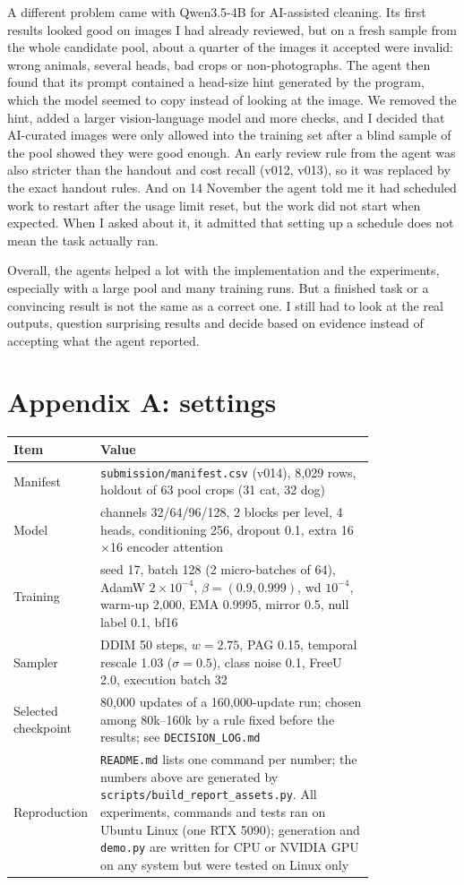 \documentclass[10pt]{article}
\begin{document}
A different problem came with Qwen3.5-4B for AI-assisted cleaning. Its first results looked good on images I had already reviewed, but on a fresh sample from the whole candidate pool, about a quarter of the images it accepted were invalid: wrong animals, several heads, bad crops or non-photographs. The agent then found that its prompt contained a head-size hint generated by the program, which the model seemed to copy instead of looking at the image. We removed the hint, added a larger vision-language model and more checks, and I decided that AI-curated images were only allowed into the training set after a blind sample of the pool showed they were good enough. An early review rule from the agent was also stricter than the handout and cost recall (v012, v013), so it was replaced by the exact handout rules. And on 14 November the agent told me it had scheduled work to restart after the usage limit reset, but the work did not start when expected. When I asked about it, it admitted that setting up a schedule does not mean the task actually ran.

Overall, the agents helped a lot with the implementation and the experiments, especially with a large pool and many training runs. But a finished task or a convincing result is not the same as a correct one. I still had to look at the real outputs, question surprising results and decide based on evidence instead of accepting what the agent reported.

\label{mainend}
{\footnotesize\setlength{\itemsep}{0pt}\setlength{\parskip}{0pt}

}
\appendix
\section*{Appendix A: settings}
\small
\begin{tabular}{@{}lp{0.80\linewidth}@{}}
\toprule
Item & Value \\
\midrule
Manifest & \texttt{submission/manifest.csv} (v014), 8{,}029 rows, holdout of 63 pool crops (31 cat, 32 dog) \\
Model & channels 32/64/96/128, 2 blocks per level, 4 heads, conditioning 256, dropout 0.1, extra 16$\times$16 encoder attention \\
Training & seed 17, batch 128 (2 micro-batches of 64), AdamW $2{\times}10^{-4}$, $\beta=(0.9,0.999)$, wd $10^{-4}$, warm-up 2{,}000, EMA 0.9995, mirror 0.5, null label 0.1, bf16 \\
Sampler & DDIM 50 steps, $w=2.75$, PAG 0.15, temporal rescale 1.03 ($\sigma=0.5$), class noise 0.1, FreeU 2.0, execution batch 32 \\
Selected checkpoint & 80{,}000 updates of a 160{,}000-update run; chosen among 80k--160k by a rule fixed before the results; see \texttt{DECISION\_LOG.md} \\
Reproduction & \texttt{README.md} lists one command per number; the numbers above are generated by \texttt{scripts/build\_report\_assets.py}. All experiments, commands and tests ran on Ubuntu Linux (one RTX 5090); generation and \texttt{demo.py} are written for CPU or NVIDIA GPU on any system but were tested on Linux only \\
\bottomrule
\end{tabular}
\end{document}

